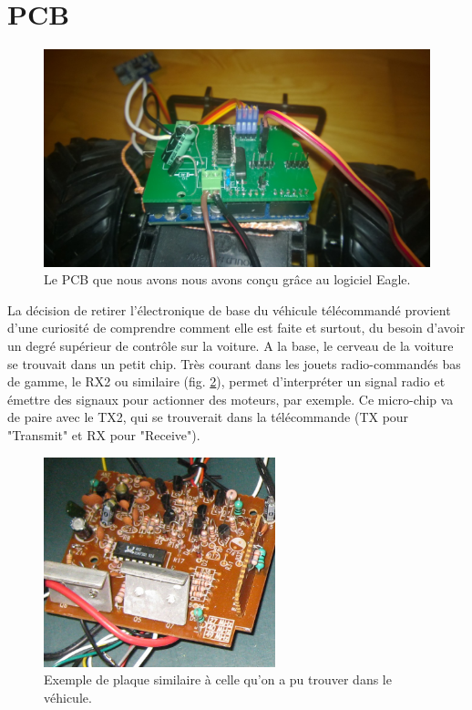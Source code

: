 \documentclass[a4paper,11pt]{report}
\begin{document}
{\section{PCB}

\begin{figure}[h!]
\centering
\includegraphics[width=1.0\textwidth]{PCB.jpg}
    \caption{\label{PCB} Le PCB que nous avons nous avons conçu grâce au logiciel Eagle.
    }
\end{figure}

La décision de retirer l'électronique de base du véhicule télécommandé
provient d'une curiosité de comprendre comment elle est faite et surtout, du
besoin d'avoir un degré supérieur de contrôle sur la voiture. A la base, le
cerveau de la voiture se trouvait dans un petit chip. Très courant dans les
jouets radio-commandés bas de gamme, le RX2 ou similaire (fig. \ref{rx2.2}), permet d'interpréter
un signal radio et émettre des signaux pour actionner des moteurs, par
exemple. Ce micro-chip va de paire avec le TX2, qui se trouverait dans la
télécommande (TX pour "Transmit" et RX pour "Receive").


\begin{figure}[h]
\centering
\includegraphics[width=0.6\textwidth]{rx2_ex2.jpg}
    \caption[Exemple de plaque RX2]{\label{rx2.2}Exemple de plaque similaire à celle qu'on a pu trouver
      dans le véhicule.}
\end{figure}

}
\end{document}
